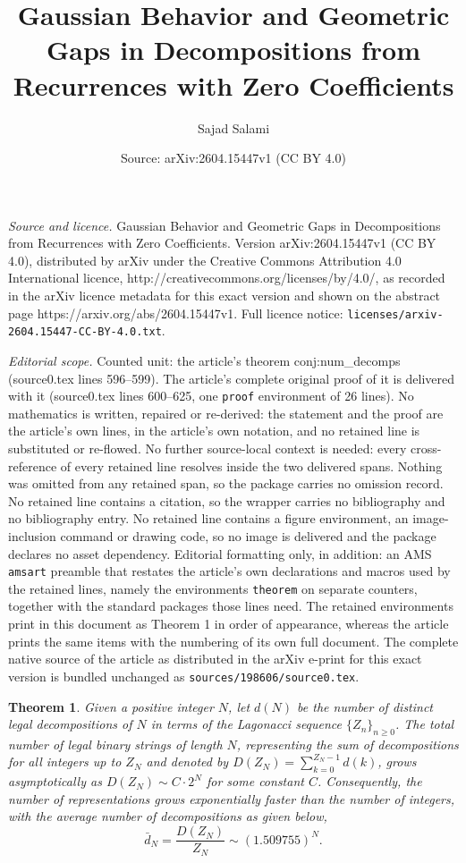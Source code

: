 \documentclass[10pt,a4paper]{amsart}
\title{Gaussian Behavior and Geometric Gaps in Decompositions from Recurrences with Zero Coefficients}
\author{Sajad Salami}
\date{Source: arXiv:2604.15447v1 (CC BY 4.0)}
\newtheorem{theorem}{Theorem}
\begin{document}
\maketitle

\noindent\emph{Source and licence.} Gaussian Behavior and Geometric Gaps in Decompositions from Recurrences with Zero Coefficients. Version arXiv:2604.15447v1 (CC BY 4.0), distributed by arXiv under the Creative Commons Attribution 4.0 International licence, http://creativecommons.org/licenses/by/4.0/, as recorded in the arXiv licence metadata for this exact version and shown on the abstract page https://arxiv.org/abs/2604.15447v1. Full licence notice: \texttt{licenses/arxiv-2604.15447-CC-BY-4.0.txt}.\par\smallskip

\noindent\textit{Editorial scope.} Counted unit: the article's theorem conj:num\_decomps (source0.tex lines 596--599). The article's complete original proof of it is delivered with it (source0.tex lines 600--625, one \texttt{proof} environment of 26 lines). No mathematics is written, repaired or re-derived: the statement and the proof are the article's own lines, in the article's own notation, and no retained line is substituted or re-flowed.  No further source-local context is needed: every cross-reference of every retained line resolves inside the two delivered spans.  Nothing was omitted from any retained span, so the package carries no omission record.  No retained line contains a citation, so the wrapper carries no bibliography and no bibliography entry.  No retained line contains a figure environment, an image-inclusion command or drawing code, so no image is delivered and the package declares no asset dependency.  Editorial formatting only, in addition: an AMS \texttt{amsart} preamble that restates the article's own declarations and macros used by the retained lines, namely the environments \texttt{theorem} on separate counters, together with the standard packages those lines need.  The retained environments print in this document as Theorem 1 in order of appearance, whereas the article prints the same items with the numbering of its own full document.  The complete native source of the article as distributed in the arXiv e-print for this exact version is bundled unchanged as \texttt{sources/198606/source0.tex}.
	\begin{theorem}
		\label{conj:num_decomps}
		Given a positive integer $N$, let $d(N)$ be the number of distinct legal decompositions of $N$ in terms of the Lagonacci sequence $\{Z_n\}_{n\geq 0}$. The total number of legal binary strings of length $N$, representing the sum of decompositions for all integers up to $Z_{N}$ and denoted by $D(Z_{N})=\sum_{k=0}^{Z_{N}-1}d(k)$, grows asymptotically as $D(Z_{N})\sim C\cdot 2^{N}$ for some constant $C$. Consequently, the number of representations grows exponentially faster than the number of integers, with the average number of decompositions as  given below, $$ \bar{d}_N = \frac{D(Z_N)}{Z_N} \sim (1.509755)^N.$$
	\end{theorem}
\end{document}
